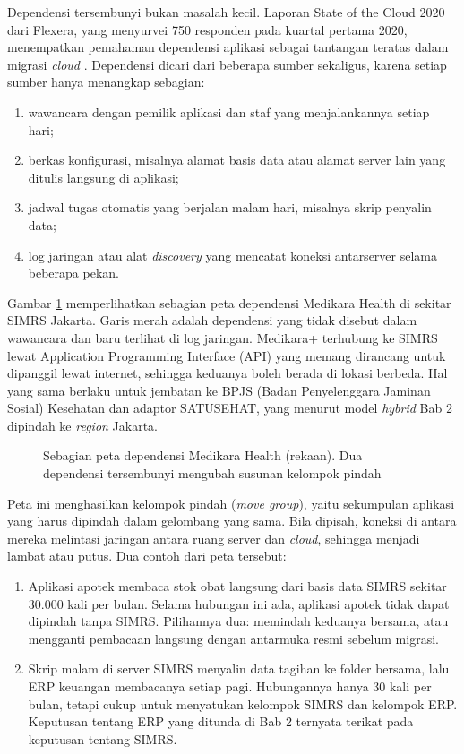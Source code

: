 Dependensi tersembunyi bukan masalah kecil. Laporan State of the Cloud 2020 dari Flexera,
yang menyurvei 750 responden pada kuartal pertama 2020, menempatkan pemahaman dependensi
aplikasi sebagai tantangan teratas dalam migrasi \textit{cloud} \cite{c04-flexera2020}.
Dependensi dicari dari beberapa sumber sekaligus, karena setiap sumber hanya menangkap
sebagian:
\begin{enumerate}
  \item wawancara dengan pemilik aplikasi dan staf yang menjalankannya setiap hari;
  \item berkas konfigurasi, misalnya alamat basis data atau alamat server lain yang ditulis
        langsung di aplikasi;
  \item jadwal tugas otomatis yang berjalan malam hari, misalnya skrip penyalin data;
  \item log jaringan atau alat \textit{discovery} yang mencatat koneksi antarserver selama
        beberapa pekan.
\end{enumerate}

Gambar \ref{fig:ch04-peta-dependensi} memperlihatkan sebagian peta dependensi Medikara
Health di sekitar SIMRS Jakarta. Garis merah adalah dependensi yang tidak disebut dalam
wawancara dan baru terlihat di log jaringan. Medikara+ terhubung ke SIMRS lewat
Application Programming Interface (API) yang memang dirancang untuk dipanggil lewat
internet, sehingga keduanya boleh berada di lokasi berbeda. Hal yang sama berlaku untuk
jembatan ke BPJS (Badan Penyelenggara Jaminan Sosial) Kesehatan dan adaptor SATUSEHAT,
yang menurut model \textit{hybrid} Bab 2 dipindah ke \textit{region} Jakarta.

\begin{figure}[!htb]
  \centering
  
  \caption{Sebagian peta dependensi Medikara Health (rekaan). Dua dependensi tersembunyi
           mengubah susunan kelompok pindah}
  \label{fig:ch04-peta-dependensi}
\end{figure}

Peta ini menghasilkan kelompok pindah (\textit{move group}), yaitu sekumpulan aplikasi
yang harus dipindah dalam gelombang yang sama. Bila dipisah, koneksi di antara mereka
melintasi jaringan antara ruang server dan \textit{cloud}, sehingga menjadi lambat atau
putus. Dua contoh dari peta tersebut:
\begin{enumerate}
  \item Aplikasi apotek membaca stok obat langsung dari basis data SIMRS sekitar 30.000
        kali per bulan. Selama hubungan ini ada, aplikasi apotek tidak dapat dipindah
        tanpa SIMRS. Pilihannya dua: memindah keduanya bersama, atau mengganti pembacaan
        langsung dengan antarmuka resmi sebelum migrasi.
  \item Skrip malam di server SIMRS menyalin data tagihan ke folder bersama, lalu ERP
        keuangan membacanya setiap pagi. Hubungannya hanya 30 kali per bulan, tetapi cukup
        untuk menyatukan kelompok SIMRS dan kelompok ERP. Keputusan tentang ERP yang
        ditunda di Bab 2 ternyata terikat pada keputusan tentang SIMRS.
\end{enumerate}

